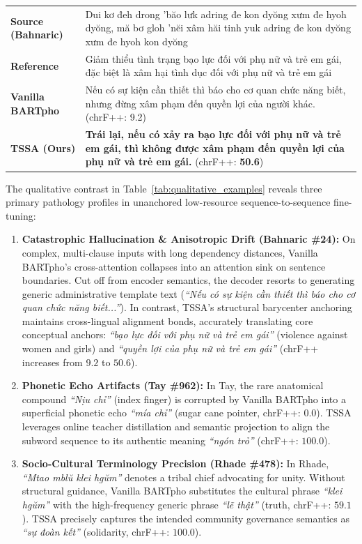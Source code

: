 \documentclass[11pt,a4paper]{article}
\begin{document}
\begin{table}[htbp]
\begin{tabular}{p{}p{}}
\textbf{Source (Bahnaric)} & Dui kơ đeh drong 'băo lưk adring đe kon dyŏng xưm đe hyoh dyŏng, mă bơ gloh 'nĕi xâm hăi tinh yuk adring đe kon dyŏng xưm đe hyoh kon dyŏng \\
\textbf{Reference} & Giảm thiểu tình trạng bạo lực đối với phụ nữ và trẻ em gái, đặc biệt là xâm hại tình dục đối với phụ nữ và trẻ em gái \\
\textbf{Vanilla BARTpho} & \textcolor{red!80!black}{Nếu có sự kiện cần thiết thì báo cho cơ quan chức năng biết, nhưng đừng xâm phạm đến quyền lợi của người khác.} (chrF++: 9.2) \\
\textbf{TSSA (Ours)} & \textcolor{topgreen}{\textbf{Trái lại, nếu có xảy ra bạo lực đối với phụ nữ và trẻ em gái, thì không được xâm phạm đến quyền lợi của phụ nữ và trẻ em gái.}} (chrF++: \textbf{50.6}) \\
\bottomrule
\end{tabular}
\end{table}

The qualitative contrast in Table~\ref{tab:qualitative_examples} reveals three primary pathology profiles in unanchored low-resource sequence-to-sequence fine-tuning:
\begin{enumerate}[leftmargin=*]
    \item \textbf{Catastrophic Hallucination \& Anisotropic Drift (Bahnaric \#24):} On complex, multi-clause inputs with long dependency distances, Vanilla BARTpho's cross-attention collapses into an attention sink on sentence boundaries. Cut off from encoder semantics, the decoder resorts to generating generic administrative template text (\textit{``Nếu có sự kiện cần thiết thì báo cho cơ quan chức năng biết...''}). In contrast, TSSA's structural barycenter anchoring maintains cross-lingual alignment bonds, accurately translating core conceptual anchors: \textit{``bạo lực đối với phụ nữ và trẻ em gái''} (violence against women and girls) and \textit{``quyền lợi của phụ nữ và trẻ em gái''} (chrF++ increases from $9.2$ to $\mathbf{50.6}$).
    \item \textbf{Phonetic Echo Artifacts (Tay \#962):} In Tay, the rare anatomical compound \textit{``Nịu chỉ''} (index finger) is corrupted by Vanilla BARTpho into a superficial phonetic echo \textit{``mía chỉ''} (sugar cane pointer, chrF++: $0.0$). TSSA leverages online teacher distillation and semantic projection to align the subword sequence to its authentic meaning \textit{``ngón trỏ''} (chrF++: $\mathbf{100.0}$).
    \item \textbf{Socio-Cultural Terminology Precision (Rhade \#478):} In Rhade, \textit{``Mtao mbl\u{u} klei hg\u{u}m''} denotes a tribal chief advocating for unity. Without structural guidance, Vanilla BARTpho substitutes the cultural phrase \textit{``klei hg\u{u}m''} with the high-frequency generic phrase \textit{``lẽ thật''} (truth, chrF++: $59.1$). TSSA precisely captures the intended community governance semantics as \textit{``sự đoàn kết''} (solidarity, chrF++: $\mathbf{100.0}$).
\end{enumerate}
\end{document}
